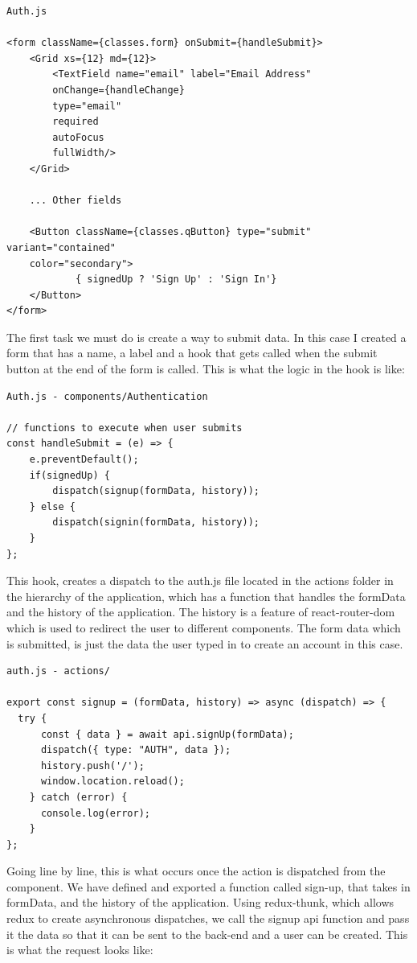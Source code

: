 \begin{verbatim}
Auth.js

<form className={classes.form} onSubmit={handleSubmit}>
    <Grid xs={12} md={12}>
        <TextField name="email" label="Email Address" 
        onChange={handleChange}
        type="email" 
        required 
        autoFocus 
        fullWidth/>
    </Grid>
    
    ... Other fields
    
    <Button className={classes.qButton} type="submit" variant="contained"
    color="secondary">
            { signedUp ? 'Sign Up' : 'Sign In'}
    </Button>
</form>
\end{verbatim}

The first task we must do is create a way to submit data. In this case I created a form that has a name, a label and a hook that gets called when the submit button at the end of the form is called. This is what the logic in the hook is like:

\begin{verbatim}
Auth.js - components/Authentication

// functions to execute when user submits
const handleSubmit = (e) => { 
    e.preventDefault();
    if(signedUp) {
        dispatch(signup(formData, history));
    } else {
        dispatch(signin(formData, history));
    }
};   
\end{verbatim}

This hook, creates a dispatch to the auth.js file located in the actions folder in the hierarchy of the application, which has a function that handles the formData and the history of the application. The history is a feature of react-router-dom which is used to redirect the user to different components. The form data which is submitted, is just the data the user typed in to create an account in this case.

\begin{verbatim}
auth.js - actions/

export const signup = (formData, history) => async (dispatch) => {
  try {
      const { data } = await api.signUp(formData);
      dispatch({ type: "AUTH", data });
      history.push('/');
      window.location.reload();
    } catch (error) {
      console.log(error);
    }
};
\end{verbatim}

Going line by line, this is what occurs once the action is dispatched from the component. We have defined and exported a function called sign-up, that takes in formData, and the history of the application. Using redux-thunk, which allows redux to create asynchronous dispatches, we call the signup api function and pass it the data so that it can be sent to the back-end and a user can be created. This is what the request looks like:

